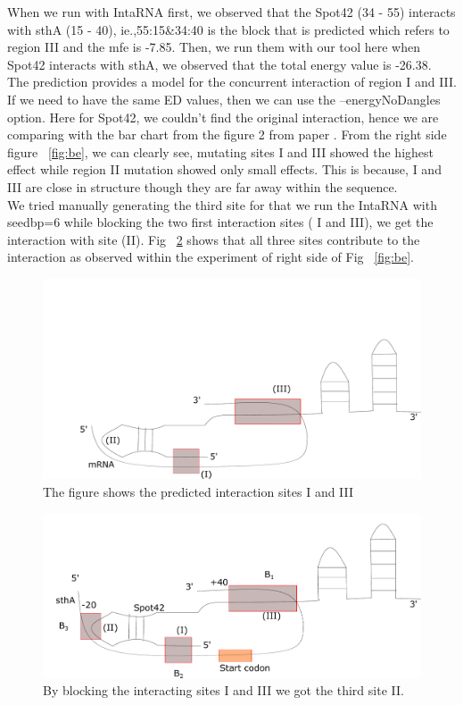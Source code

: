 \documentclass[twoside,a4paper]{report}
\numberwithin{equation}{section}
\begin{document}
When we run with IntaRNA first, we observed that the Spot42 (34 - 55) interacts with sthA (15 - 40), ie.,55:15\&34:40 is the block that is predicted which refers to region III and the mfe is -7.85. Then, we run them with our tool here when Spot42 interacts with sthA, we observed that the total energy value is -26.38. The prediction provides a model for the concurrent interaction of region I and III. If we need to have the same ED values, then we can use the --energyNoDangles option. Here for Spot42, we couldn't find the original interaction, hence we are comparing with the bar chart from the figure 2 from paper {\citep{beisel2011base}}. From the right side figure ~\ref{fig:be}, we can clearly see, mutating sites I and III showed the highest effect while region II mutation showed only small effects. This is because, I and III are close in structure though they are far away within the sequence.\\

We tried manually generating the third site for that we run the IntaRNA with seedbp=6 while blocking the two first interaction sites ( I and III), we get the interaction with site (II). Fig ~\ref{fig:thirdsite} shows that all three sites contribute to the interaction as observed within the experiment of right side of Fig ~\ref{fig:be}.  \\


\begin{figure}[h!tb]
	\includegraphics[width=1.0\linewidth]{twosite.pdf}
	\centering
	\caption{ The figure shows the predicted interaction sites I and III } 
	\label{fig:twosite}
\end{figure}

	\begin{figure}[h!tb]
	\includegraphics[width=1.0\linewidth]{thirdsite.pdf}
	\centering
	\caption{ By blocking the interacting sites I and III we got the third site II. } 
	\label{fig:thirdsite}
\end{figure}
\end{document}
